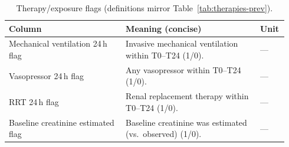 \vspace{0.75\baselineskip}
\begin{table}[t]\centering
{\small\renewcommand{\arraystretch}{1.12}\setlength{\tabcolsep}{6pt}%
\caption{Therapy/exposure flags (definitions mirror Table~\ref{tab:therapies-prev}).}
\label{app:tab-therapies}
\begin{tabular}{P{0.40\linewidth} P{0.46\linewidth} P{0.08\linewidth}}
\toprule
\textbf{Column} & \textbf{Meaning (concise)} & \textbf{Unit}\\
\midrule
Mechanical ventilation 24\,h flag & Invasive mechanical ventilation within T0--T24 (1/0). & ---\\
Vasopressor 24\,h flag & Any vasopressor within T0--T24 (1/0). & ---\\
RRT 24\,h flag & Renal replacement therapy within T0--T24 (1/0). & ---\\
Baseline creatinine estimated flag & Baseline creatinine was estimated (vs.\ observed) (1/0). & ---\\
\bottomrule
\end{tabular}}
\end{table}

